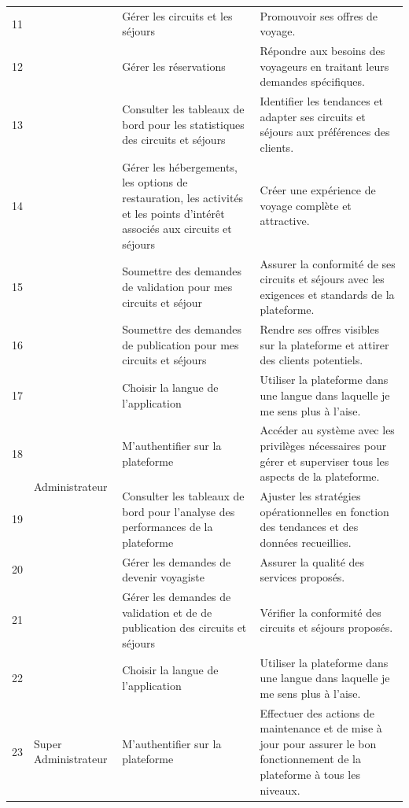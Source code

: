 \documentclass[12pt]{report}
\begin{document}
\begin{longtable}{|p{2cm}|p{4cm}|p{4cm}|p{4cm}|}
					11 & &Gérer les circuits et les séjours & Promouvoir ses offres de voyage.\\ \cline{1-1} \cline{3-4}
					12 & & Gérer les réservations & Répondre aux besoins des voyageurs en traitant leurs demandes spécifiques.\\ \cline{1-1} \cline{3-4}
					13  & & Consulter les tableaux de bord pour les statistiques des circuits et séjours & Identifier les tendances et adapter ses circuits et séjours aux préférences des clients.\\ \cline{1-1} \cline{3-4}
					14 & & Gérer les hébergements, les options de restauration, les activités et les points d'intérêt associés aux circuits et séjours & Créer une expérience de voyage complète et attractive.\\ \cline{1-1} \cline{3-4}
					15 & &  Soumettre des demandes de validation pour mes circuits et séjour& Assurer la conformité de ses circuits et séjours avec les exigences et standards de la plateforme.\\ \cline{1-1} \cline{3-4}
					16 & &  Soumettre des demandes de publication pour mes circuits et séjours & Rendre ses offres visibles sur la plateforme et attirer des clients potentiels. \\ 	
					\hline
					17 & & Choisir la langue de l’application & Utiliser la plateforme dans une langue dans laquelle je me sens plus à l’aise. \\
					\hline
					18 & \multirow{2}{*}{Administrateur} & M'authentifier sur la plateforme & Accéder au système avec les privilèges nécessaires pour gérer et superviser tous les aspects de la plateforme.\\ \cline{1-1} \cline{3-4}
					19 & &  Consulter les tableaux de bord pour  l'analyse des performances de la plateforme &Ajuster les stratégies opérationnelles en fonction des tendances et des données recueillies.\\ \cline{1-1} \cline{3-4}
					20 && Gérer les demandes de devenir voyagiste & Assurer la qualité des services proposés.\\ \cline{1-1} \cline{3-4}
					21 & &Gérer les demandes de validation et de de publication des circuits et séjours  &Vérifier la conformité des circuits et séjours proposés.\\ \cline{1-1} \cline{3-4}
					22 && Choisir la langue de l’application & Utiliser la plateforme dans une langue dans laquelle je me sens plus à l’aise. \\
					\hline
					23 &\multirow{2}{*}{Super Administrateur} & M'authentifier sur la plateforme &Effectuer des actions de maintenance et de mise à jour pour assurer le bon fonctionnement de la plateforme à tous les niveaux.\\ \cline{1-1} \cline{3-4}	

\end{longtable}
\end{document}
